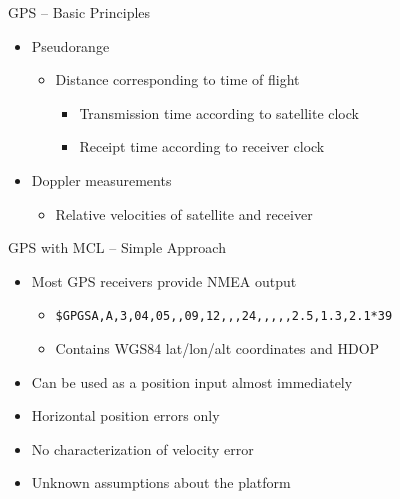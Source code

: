 \documentclass[utf8,12pt]{beamer}
\begin{document}
{
\begin{frame}{GPS -- Basic Principles}
    \begin{itemize}
        \item Pseudorange
        \begin{itemize}
            \item Distance corresponding to time of flight
            \begin{itemize}
                \item Transmission time according to satellite clock
                \item Receipt time according to receiver clock
            \end{itemize}
        \end{itemize}
        \item Doppler measurements
        \begin{itemize}
            \item Relative velocities of satellite and receiver
        \end{itemize}
    \end{itemize}
\end{frame}
}

{
\begin{frame}[fragile]{GPS with MCL -- Simple Approach}
    \begin{itemize}
        \item Most GPS receivers provide NMEA output
        \begin{itemize}
            \item{\footnotesize\verb=$GPGSA,A,3,04,05,,09,12,,,24,,,,,2.5,1.3,2.1*39=}
            \item Contains WGS84 lat/lon/alt coordinates and HDOP
        \end{itemize}
        \item Can be used as a position input almost immediately
    \end{itemize}
    \vspace{0.5cm}
    \begin{itemize}
        \item Horizontal position errors only
        \item No characterization of velocity error
        \item Unknown assumptions about the platform
    \end{itemize}
\end{frame}
}
\end{document}
